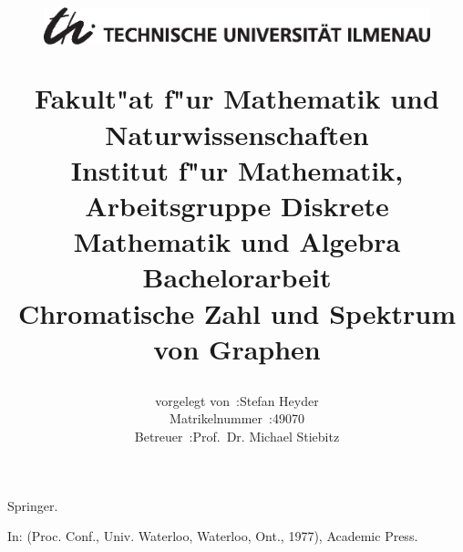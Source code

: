 \documentclass[a4paper,11pt]{article}
\begin{document}
\renewcommand{\baselinestretch}{1.5}\normalsize

\title{
    \begin{figure}[htbp]
        \vspace{-48pt}
        \centering
        \includegraphics[height=36pt]{images/TULogo.eps}
    \end{figure}\vspace{-16pt}
    \Large Fakult"at f"ur Mathematik und Naturwissenschaften\\
    \vspace{5pt}
    \small Institut f"ur Mathematik, Arbeitsgruppe Diskrete Mathematik und Algebra\\
    \vspace{100pt}
  \Huge {\bf Bachelorarbeit}\\
  \vspace{90pt}
    \huge {\bf Chromatische Zahl und Spektrum von Graphen}\\
    \vspace{100pt}
}

\author{
    \begin{tabular}{rl}
      vorgelegt von~:& Stefan Heyder\\
     Matrikelnummer~:& 49070\\
           Betreuer~:& Prof.~Dr. Michael Stiebitz
\end{tabular}
    \vspace{20pt}
}
\date{\datum}
\maketitle
\thispagestyle{empty}

\newpage
\tableofcontents
\thispagestyle{empty}
\newpage
{}




\newpage
{}

\begin{thebibliography}{1}

  
  

   Springer.

 
In:  (Proc. Conf., Univ. Waterloo, Waterloo, Ont., 1977), 
Academic Press.

\end{thebibliography}
\end{document}
